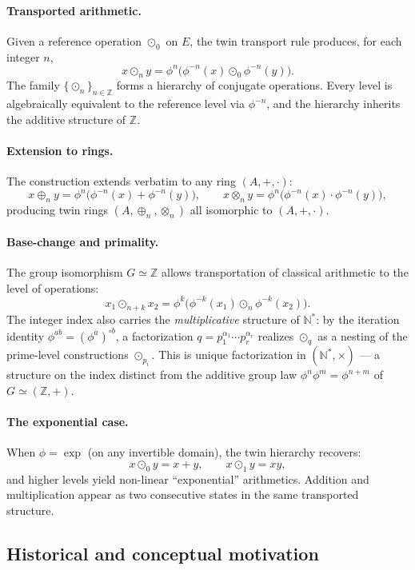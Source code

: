 \documentclass[11pt]{article}
\theoremstyle{definition}
\theoremstyle{remark}
\newcommand{\Z}{\mathbb{Z}}
\newcommand{\N}{\mathbb{N}}
\begin{document}
	\paragraph{Transported arithmetic.}
	Given a reference operation $\odot_0$ on $E$, the twin transport rule produces,
	for each integer $n$,
	\[
	x \odot_n y
	=
	\phi^{n}\bigl(\phi^{-n}(x)\odot_0\phi^{-n}(y)\bigr).
	\]
	The family $\{\odot_n\}_{n\in\Z}$ forms a hierarchy of conjugate operations.
	Every level is algebraically equivalent to the reference level via
	$\phi^{-n}$, and the hierarchy inherits the additive structure of $\Z$.
	
	\paragraph{Extension to rings.}
	The construction extends verbatim to any ring $(A,+,\cdot)$:
	\[
	x\oplus_n y = \phi^{n}\bigl(\phi^{-n}(x)+\phi^{-n}(y)\bigr),\qquad
	x\otimes_n y = \phi^{n}\bigl(\phi^{-n}(x)\cdot\phi^{-n}(y)\bigr),
	\]
	producing twin rings $(A,\oplus_n,\otimes_n)$ all isomorphic to $(A,+,\cdot)$.
	
	\paragraph{Base-change and primality.}
	The group isomorphism $G\simeq\Z$ allows transportation of classical arithmetic
	to the level of operations:
	\[
	x_1 \odot_{n+k} x_2
	=
	\phi^{k}\bigl(\phi^{-k}(x_1)\odot_n \phi^{-k}(x_2)\bigr).
	\]
The integer index also carries the \emph{multiplicative} structure of $\N^*$: by the
iteration identity $\phi^{ab}=(\phi^a)^{\circ b}$, a factorization $q=p_1^{\alpha_1}\cdots p_r^{\alpha_r}$
realizes $\odot_q$ as a nesting of the prime-level constructions $\odot_{p_i}$. This is unique
factorization in $(\N^*,\times)$ --- a structure on the index distinct from the additive group
law $\phi^n\phi^m=\phi^{n+m}$ of $G\simeq(\Z,+)$.
	
	\paragraph{The exponential case.}
	When $\phi=\exp$ (on any invertible domain), the twin hierarchy recovers:
	\[
	x\odot_0 y=x+y,\qquad x\odot_1 y = xy,
	\]
	and higher levels yield non-linear ``exponential'' arithmetics.
	Addition and multiplication appear as two consecutive states in the same 
	transported structure.
	
	\subsection*{Historical and conceptual motivation}
	
\end{document}
